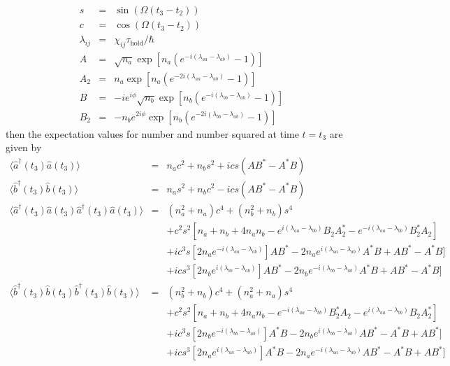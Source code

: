 \documentclass[12pt]{iopart}
\begin{document}
\begin{eqnarray}
s &=& \sin(\Omega (t_3 - t_2)) \\
c &=& \cos(\Omega (t_3 - t_2)) \\
\lambda_{ij} &=& \chi_{ij} \tau_{\mathrm{hold}} / \hbar \\
A &=& \sqrt{n_a} \exp [n_a (e^{-i(\lambda_{aa}-\lambda_{ab})} - 1 )] \\
A_2 &=& n_a \exp [n_a (e^{-2i(\lambda_{aa}-\lambda_{ab})} - 1 )] \\
B &=& -i e^{i \phi}\sqrt{n_b} \exp [n_b (e^{-i(\lambda_{bb}-\lambda_{ab})} - 1 )] \\
B_2 &=& -n_b e^{2i\phi} \exp [n_b (e^{-2i(\lambda_{bb}-\lambda_{ab})} - 1 )]
\end{eqnarray}
then the expectation values for number and number squared at time $t=t_3$ are given by
\begin{eqnarray}
\langle \hat{a}^{\dagger}(t_3) \hat{a}(t_3) \rangle &=& n_a c^2 + n_b s^2 + i c s (A B^* - A^* B) \\
%
\langle \hat{b}^{\dagger}(t_3) \hat{b}(t_3) \rangle &=& n_a s^2 + n_b c^2 - i c s (A B^* - A^* B) \\
%
\langle \hat{a}^{\dagger}(t_3) \hat{a}(t_3) \hat{a}^{\dagger}(t_3)  \hat{a}(t_3) \rangle &=& (n_a^2 + n_a) c^4 + (n_b^2 + n_b) s^4 \nonumber \\
&& + c^2 s^2 [n_a +n_b +4 n_a n_b - e^{i(\lambda_{aa}-\lambda_{bb})} B_2 A_2^* - e^{-i(\lambda_{aa}-\lambda_{bb})} B_2^* A_2] \nonumber \\
&& + i c^3 s [2 n_a e^{-i(\lambda_{aa}-\lambda_{ab})}] A B^* - 2 n_a e^{i(\lambda_{aa}-\lambda_{ab})} A^* B + A B^* - A^* B] \nonumber \\
&& + i c s^3 [2 n_b e^{i(\lambda_{bb}-\lambda_{ab})}] A B^* - 2 n_b e^{-i(\lambda_{bb}-\lambda_{ab})} A^* B + A B^* - A^* B] \\
%
\langle \hat{b}^{\dagger}(t_3)  \hat{b}(t_3) \hat{b}^{\dagger}(t_3)  \hat{b}(t_3) \rangle &=& (n_b^2 + n_b) c^4 + (n_a^2 + n_a) s^4 \nonumber \\
&& + c^2 s^2 [n_a +n_b +4 n_a n_b - e^{-i(\lambda_{aa}-\lambda_{bb})} B_2^* A_2 - e^{i(\lambda_{aa}-\lambda_{bb})} B_2 A_2^*] \nonumber \\
&& + i c^3 s [2 n_b e^{-i(\lambda_{bb}-\lambda_{ab})}] A^* B - 2 n_b e^{i(\lambda_{bb}-\lambda_{ab})} A B^* - A^* B + A B^*] \nonumber \\
&& + i c s^3 [2 n_a e^{i(\lambda_{aa}-\lambda_{ab})}] A^* B - 2 n_a e^{-i(\lambda_{aa}-\lambda_{ab})} A B^* - A^* B + A B^*] 
\end{eqnarray}
\end{document}
